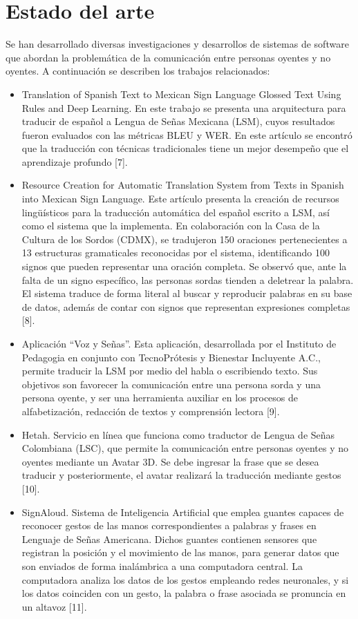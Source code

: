 \section{Estado del arte}
Se han desarrollado diversas investigaciones y desarrollos de sistemas de software que abordan la problemática de la comunicación entre personas oyentes y no oyentes. A continuación se describen los trabajos relacionados: 
\begin{itemize}
    \item Translation of Spanish Text to Mexican Sign Language Glossed Text Using Rules and Deep Learning. En este trabajo se presenta una arquitectura para traducir de español a Lengua de Señas Mexicana (LSM), cuyos resultados fueron evaluados con las métricas BLEU y WER. En este artículo se encontró que la traducción con técnicas tradicionales tiene un mejor desempeño que el aprendizaje profundo [7].
\item Resource Creation for Automatic Translation System from Texts in Spanish into Mexican Sign Language. Este artículo presenta la creación de recursos lingüísticos para la traducción automática del español escrito a LSM, así como el sistema que la implementa. En colaboración con la Casa de la Cultura de los Sordos (CDMX), se tradujeron 150 oraciones pertenecientes a 13 estructuras gramaticales reconocidas por el sistema, identificando 100 signos que pueden representar una oración completa. Se observó que, ante la falta de un signo específico, las personas sordas tienden a deletrear la palabra. El sistema traduce de forma literal al buscar y reproducir palabras en su base de datos, además de contar con signos que representan expresiones completas [8].
\item Aplicación “Voz y Señas”. Esta aplicación, desarrollada por el Instituto de Pedagogia en conjunto con TecnoPrótesis y Bienestar Incluyente A.C.,  permite traducir la LSM por medio del habla o escribiendo texto. Sus objetivos son favorecer la comunicación entre una persona sorda y una persona oyente, y ser una herramienta auxiliar en los procesos de alfabetización, redacción de textos y comprensión lectora [9]. 
\item Hetah. Servicio en línea que funciona como traductor de Lengua de Señas Colombiana (LSC), que permite la comunicación entre personas oyentes y no oyentes mediante un Avatar 3D. Se debe ingresar la frase que se desea traducir y posteriormente, el avatar realizará la traducción mediante gestos [10]. 
\item SignAloud. Sistema de Inteligencia Artificial que emplea guantes capaces de reconocer gestos de las manos correspondientes a palabras y frases en Lenguaje de Señas Americana. Dichos guantes contienen sensores que registran la posición y el movimiento de las manos, para generar datos que son enviados de forma inalámbrica a una computadora central. La computadora analiza los datos de los gestos empleando redes neuronales, y si los datos coinciden con un gesto, la palabra o frase asociada se pronuncia en un altavoz [11].

\end{itemize}
